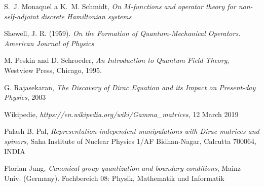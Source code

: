 \begin{thebibliography}{10}

    S.~J. Monaquel a K.~M. Schmidt, \textit{On $M$-functions and operator
      theory for non-self-adjoint discrete Hamiltonian systems}

        Shewell, J. R. (1959). \textit{On the Formation of Quantum-Mechanical 
        Operators. American Journal of Physics}

        M. Peskin and D. Schroeder, \textit{An Introduction to Quantum Field Theory},
        Westview Press, Chicago, 1995.

        G. Rajasekaran, \textit{The Discovery of Dirac Equation and its Impact on Present-day Physics},
        2003

        Wikipedie, \textit{https://en.wikipedia.org/wiki/Gamma\_matrices},
        12 March 2019

        Palash B. Pal, \textit{Representation-independent manipulations with Dirac matrices and spinors},
        Saha Institute of Nuclear Physics 1/AF Bidhan-Nagar, Calcutta 700064, INDIA

        Florian Jung, \textit{Canonical group quantization and boundary conditions},
        Mainz Univ. (Germany). Fachbereich 08: Physik, Mathematik und Informatik

\end{thebibliography}

\cleardoublepage
